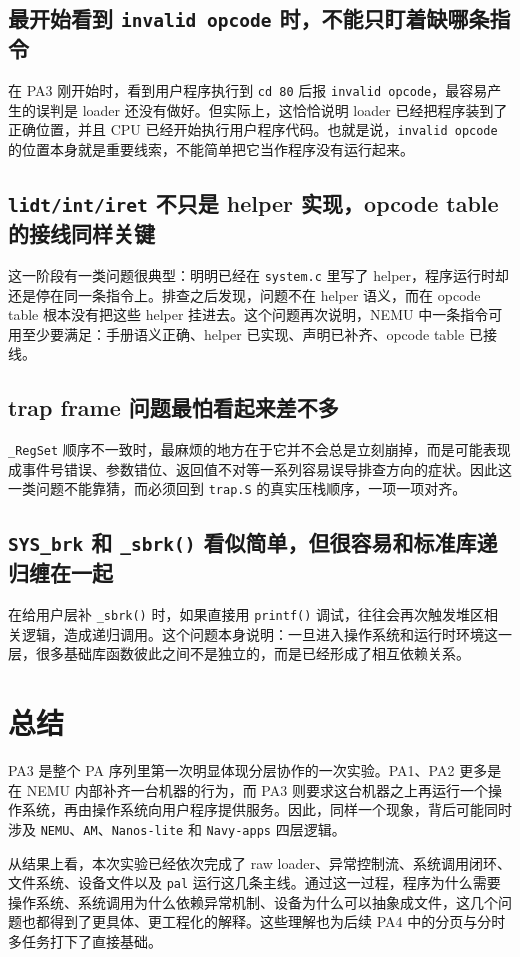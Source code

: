 \documentclass[a4paper]{article}
\begin{document}
\subsection{最开始看到 \texttt{invalid opcode} 时，不能只盯着缺哪条指令}
在 PA3 刚开始时，看到用户程序执行到 \texttt{cd 80} 后报 \texttt{invalid opcode}，最容易产生的误判是 loader 还没有做好。但实际上，这恰恰说明 loader 已经把程序装到了正确位置，并且 CPU 已经开始执行用户程序代码。也就是说，\texttt{invalid opcode} 的位置本身就是重要线索，不能简单把它当作程序没有运行起来。

\subsection{\texttt{lidt/int/iret} 不只是 helper 实现，opcode table 的接线同样关键}
这一阶段有一类问题很典型：明明已经在 \texttt{system.c} 里写了 helper，程序运行时却还是停在同一条指令上。排查之后发现，问题不在 helper 语义，而在 opcode table 根本没有把这些 helper 挂进去。这个问题再次说明，NEMU 中一条指令可用至少要满足：手册语义正确、helper 已实现、声明已补齐、opcode table 已接线。

\subsection{trap frame 问题最怕看起来差不多}
\texttt{\_RegSet} 顺序不一致时，最麻烦的地方在于它并不会总是立刻崩掉，而是可能表现成事件号错误、参数错位、返回值不对等一系列容易误导排查方向的症状。因此这一类问题不能靠猜，而必须回到 \texttt{trap.S} 的真实压栈顺序，一项一项对齐。

\subsection{\texttt{SYS\_brk} 和 \texttt{\_sbrk()} 看似简单，但很容易和标准库递归缠在一起}
在给用户层补 \texttt{\_sbrk()} 时，如果直接用 \texttt{printf()} 调试，往往会再次触发堆区相关逻辑，造成递归调用。这个问题本身说明：一旦进入操作系统和运行时环境这一层，很多基础库函数彼此之间不是独立的，而是已经形成了相互依赖关系。

\section{总结}
PA3 是整个 PA 序列里第一次明显体现分层协作的一次实验。PA1、PA2 更多是在 NEMU 内部补齐一台机器的行为，而 PA3 则要求这台机器之上再运行一个操作系统，再由操作系统向用户程序提供服务。因此，同样一个现象，背后可能同时涉及 \texttt{NEMU}、\texttt{AM}、\texttt{Nanos-lite} 和 \texttt{Navy-apps} 四层逻辑。

从结果上看，本次实验已经依次完成了 raw loader、异常控制流、系统调用闭环、文件系统、设备文件以及 \texttt{pal} 运行这几条主线。通过这一过程，程序为什么需要操作系统、系统调用为什么依赖异常机制、设备为什么可以抽象成文件，这几个问题也都得到了更具体、更工程化的解释。这些理解也为后续 PA4 中的分页与分时多任务打下了直接基础。
\end{document}
